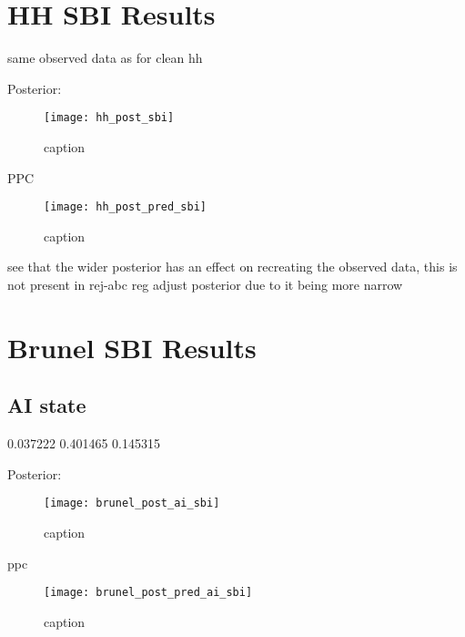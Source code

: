 \section{HH SBI Results}

same observed data as for clean hh

Posterior:

\begin{figure}[H]
    \centering
    \texttt{[image: hh\_post\_sbi]}
    \caption{caption}
    \label{fig:fig1}
\end{figure}

PPC

\begin{figure}[H]
    \centering
    \texttt{[image: hh\_post\_pred\_sbi]}
    \caption{caption}
    \label{fig:fig1}
\end{figure}

see that the wider posterior has an effect on recreating the observed data, this is not present in rej-abc reg adjust posterior due to it being more narrow


\section{Brunel SBI Results}

\subsection{AI state} 



0.037222	0.401465	0.145315

Posterior:

\begin{figure}[H]
    \centering
    \texttt{[image: brunel\_post\_ai\_sbi]}
    \caption{caption}
    \label{fig:fig1}
\end{figure}

ppc 

\begin{figure}[H]
    \centering
    \texttt{[image: brunel\_post\_pred\_ai\_sbi]}
    \caption{caption}
    \label{fig:fig1}
\end{figure}

